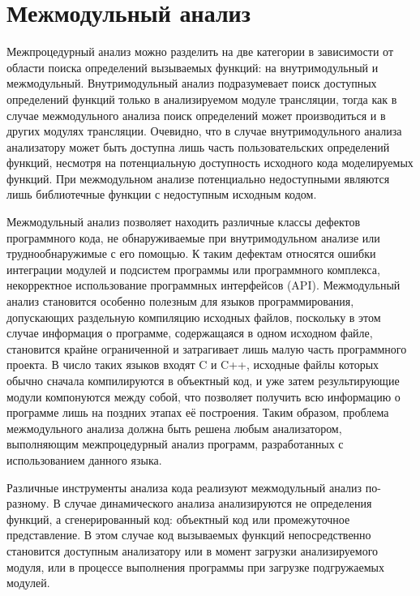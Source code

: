 \chapter{Межмодульный анализ} \label{chapt3}

Межпроцедурный анализ можно разделить на две категории в зависимости от области поиска определений вызываемых функций: на внутримодульный и межмодульный. Внутримодульный анализ подразумевает поиск доступных определений функций только в анализируемом модуле трансляции, тогда как в случае межмодульного анализа поиск определений может производиться и в других модулях трансляции. Очевидно, что в случае внутримодульного анализа анализатору может быть доступна лишь часть пользовательских определений функций, несмотря на потенциальную доступность исходного  кода моделируемых функций. При межмодульном анализе потенциально недоступными являются лишь библиотечные функции с недоступным исходным кодом.

Межмодульный анализ позволяет находить различные классы дефектов программного кода, не обнаруживаемые при внутримодульном анализе или труднообнаружимые с его помощью. К таким дефектам относятся ошибки интеграции модулей и подсистем программы или программного комплекса, некорректное использование программных интерфейсов (API). Межмодульный анализ становится особенно полезным для языков программирования, допускающих раздельную компиляцию исходных файлов, поскольку в этом случае информация о программе, содержащаяся в одном исходном файле, становится крайне ограниченной и затрагивает лишь малую часть программного проекта. В число таких языков входят C и C++, исходные файлы которых обычно сначала компилируются в объектный код, и уже затем результирующие модули компонуются между собой, что позволяет получить всю информацию о программе лишь на поздних этапах её построения. Таким образом, проблема межмодульного анализа  должна быть решена любым анализатором, выполняющим межпроцедурный анализ программ, разработанных с использованием данного языка.

Различные инструменты анализа кода реализуют межмодульный анализ по-разному. В случае динамического анализа анализируются не определения функций, а сгенерированный код: объектный код или промежуточное представление. В этом случае код вызываемых функций непосредственно становится доступным анализатору или в момент загрузки анализируемого модуля, или в процессе выполнения программы при загрузке подгружаемых модулей.

